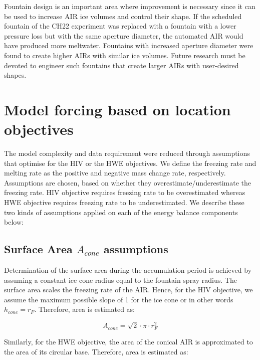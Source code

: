 \documentclass[tc, manuscript]{copernicus}
\begin{document}
Fountain design is an important area where improvement is necessary since it can be used to increase AIR ice
volumes and control their shape. If the scheduled fountain of the CH22 experiment was replaced with a fountain
with a lower pressure loss but with the same aperture diameter, the automated AIR would have produced more
meltwater. Fountains with increased aperture diameter were found to create higher AIRs with similar ice volumes.
Future research must be devoted to engineer such fountains that create larger AIRs with user-desired shapes.

\appendix

\section{Model forcing based on location objectives}\label{sec:SEB}

The model complexity and data requirement \citep{balasubramanianInfluenceMeteorologicalConditions2022} were
reduced through assumptions that optimise for the HIV or the HWE objectives. We define the freezing rate and
melting rate as the positive and negative mass change rate, respectively. Assumptions are chosen, based on
whether they overestimate/underestimate the freezing rate. HIV objective requires freezing rate to be
overestimated whereas HWE objective requires freezing rate to be underestimated. We describe these two kinds of
assumptions applied on each of the energy balance components below: 

\subsection{Surface Area $A_{cone}$ assumptions}

Determination of the surface area during the accumulation period is achieved by assuming a constant ice cone
radius equal to the fountain spray radius. The surface area scales the freezing rate of the AIR. Hence, for the
HIV objective, we assume the maximum possible slope of 1 for the ice cone or in other words $h_{cone} = r_{F}$.
Therefore, area is estimated as:  

\begin{equation} A_{cone} =\sqrt{2} \cdot \pi \cdot r_{F}^2  \end{equation}

Similarly, for the HWE objective, the area of the conical AIR is approximated to the area of its circular
base. Therefore, area is estimated as:
\end{document}

